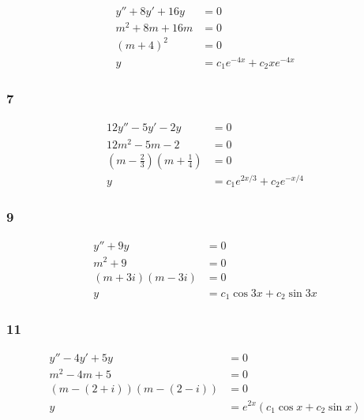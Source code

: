 \documentclass{article}
\begin{document}
\begin{align*}
  y'' + 8y' + 16y & = 0                           \\
  m^2 + 8m + 16m  & = 0                           \\
  (m + 4)^2       & = 0                           \\
  y               & = c_1 e^{-4x} + c_2 x e^{-4x}
\end{align*}

\subsubsection{7}

\begin{align*}
  12y'' - 5y' - 2y                                              & = 0                                \\
  12m^2 - 5m - 2                                                & = 0                                \\
  \left( m - \frac{2}{3} \right) \left( m + \frac{1}{4} \right) & = 0                                \\
  y                                                             & = c_1 e^{2 x / 3} + c_2 e^{-x / 4}
\end{align*}

\subsubsection{9}

\begin{align*}
  y'' + 9y          & = 0                         \\
  m^2 + 9           & = 0                         \\
  (m + 3i) (m - 3i) & = 0                         \\
  y                 & = c_1 \cos 3x + c_2 \sin 3x
\end{align*}

\subsubsection{11}

\begin{align*}
  y'' - 4y' + 5y              & = 0                                \\
  m^2 - 4m + 5                & = 0                                \\
  (m - (2 + i)) (m - (2 - i)) & = 0                                \\
  y                           & = e^{2x} (c_1 \cos x + c_2 \sin x)
\end{align*}
\end{document}
